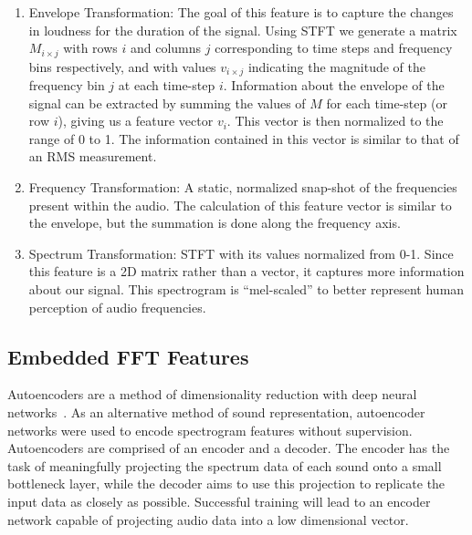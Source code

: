 \documentclass[\main/thesis.tex]{subfiles}
\begin{document}
\begin{enumerate}
\item Envelope Transformation: The goal of this feature is to capture the changes in loudness for the duration of the signal. Using STFT we generate a matrix $M_{i \times j}$ with rows $i$ and columns $j$ corresponding to time steps and frequency bins respectively, and with values $v_{i \times j}$ indicating the magnitude of the frequency bin $j$ at each time-step $i$. Information about the envelope of the signal can be extracted by summing the values of $M$ for each time-step (or row $i$), giving us a feature vector $v_i$. This vector is then normalized to the range of 0 to 1. The information contained in this vector is similar to that of an RMS measurement.
\item Frequency Transformation: A static, normalized snap-shot of the  frequencies present within the audio. The calculation of this feature vector is similar to the envelope, but the summation is done along the frequency axis.
\item Spectrum Transformation: STFT with its values normalized from 0-1. Since this feature is a 2D matrix rather than a vector, it captures more information about our signal. This spectrogram is \enquote{mel-scaled}\cite{stevens1940relation} to better represent human perception of audio frequencies.
\end{enumerate}
\subsection{Embedded FFT Features}
\label{section:embedded_feats}
% 
Autoencoders are a method of dimensionality reduction with deep neural networks~\cite{hinton1994autoencoders,hinton2006reducing}. As an alternative method of sound representation, autoencoder networks were used to encode spectrogram features without supervision. Autoencoders are comprised of an encoder and a decoder. The encoder has the task of meaningfully projecting the spectrum data of each sound onto a small bottleneck layer, while the decoder aims to use this projection to replicate the input data as closely as possible. Successful training will lead to an encoder network capable of projecting audio data into a low dimensional vector. 
\end{document}
